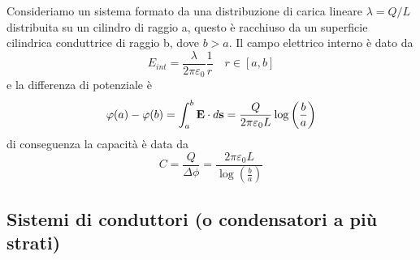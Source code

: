 Consideriamo un sistema formato da una distribuzione di carica lineare $\lambda = Q/L$ distribuita su un cilindro di raggio a, questo \`e racchiuso da un superficie cilindrica conduttrice di raggio b, dove $b>a$. Il campo elettrico interno \`e dato da 
\begin{equation*}
	E_{int} = \frac{\lambda}{2 \pi \varepsilon_0 } \frac{1}{r } \quad r \in [a,b]
\end{equation*}
e la differenza di potenziale \`e 
\begin{equation*}
	\varphi(a) - \varphi(b) = \int_{a}^{b} \bold{E} \cdot d\bold{s} = \frac{Q}{2 \pi \varepsilon_0 L } \log \left(\frac{b}{a}\right )
\end{equation*}
di conseguenza la capacit\`a \`e data da
\begin{equation*}
	C = \frac{Q}{\Delta \phi} = \frac{2 \pi \varepsilon_0 L}{\log \left(\frac{b}{a} \right)}
\end{equation*}

\subsection{Sistemi di conduttori (o condensatori a pi\`u strati)}

